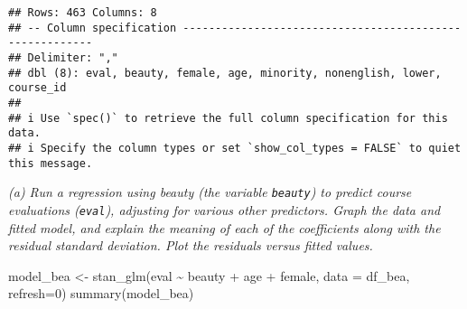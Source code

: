 \documentclass[
]{article}
\newenvironment{Shaded}{\begin{snugshade}}{\end{snugshade}}
\newcommand{\AttributeTok}[1]{\textcolor[rgb]{0.77,0.63,0.00}{#1}}
\newcommand{\DecValTok}[1]{\textcolor[rgb]{0.00,0.00,0.81}{#1}}
\newcommand{\FunctionTok}[1]{\textcolor[rgb]{0.00,0.00,0.00}{#1}}
\newcommand{\NormalTok}[1]{#1}
\newcommand{\OtherTok}[1]{\textcolor[rgb]{0.56,0.35,0.01}{#1}}
\newcommand{\SpecialCharTok}[1]{\textcolor[rgb]{0.00,0.00,0.00}{#1}}
\begin{document}
\begin{verbatim}
## Rows: 463 Columns: 8
## -- Column specification --------------------------------------------------------
## Delimiter: ","
## dbl (8): eval, beauty, female, age, minority, nonenglish, lower, course_id
## 
## i Use `spec()` to retrieve the full column specification for this data.
## i Specify the column types or set `show_col_types = FALSE` to quiet this message.
\end{verbatim}

\begin{Shaded}
\end{Shaded}

\emph{(a) Run a regression using beauty (the variable \texttt{beauty})
to predict course evaluations (\texttt{eval}), adjusting for various
other predictors. Graph the data and fitted model, and explain the
meaning of each of the coefficients along with the residual standard
deviation. Plot the residuals versus fitted values.}

\begin{Shaded}
\begin{Highlighting}[]
\NormalTok{model\_bea }\OtherTok{\textless{}{-}} \FunctionTok{stan\_glm}\NormalTok{(eval }\SpecialCharTok{\textasciitilde{}}\NormalTok{ beauty }\SpecialCharTok{+}\NormalTok{ age }\SpecialCharTok{+}\NormalTok{ female, }\AttributeTok{data =}\NormalTok{ df\_bea, }\AttributeTok{refresh=}\DecValTok{0}\NormalTok{)}
\FunctionTok{summary}\NormalTok{(model\_bea)}
\end{Highlighting}
\end{Shaded}
\end{document}
